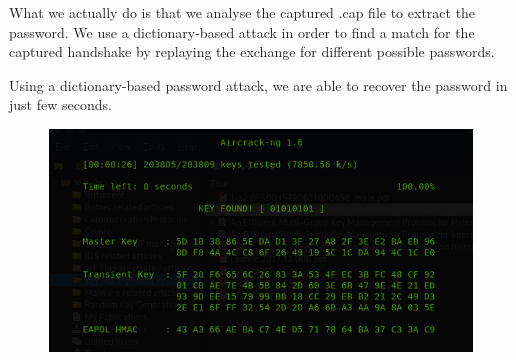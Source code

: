 What we actually do is that we analyse the captured .cap file to extract the password. We use a dictionary-based attack in order to find a match for the captured handshake by replaying the exchange for different possible passwords.


Using a dictionary-based password attack, we are able to recover the password in just few seconds.

\begin{figure}[htbp]
	\centerline{\includegraphics[scale=0.50]{figures/wifi/aircrack2.png}}
	\label{fig}
\end{figure}